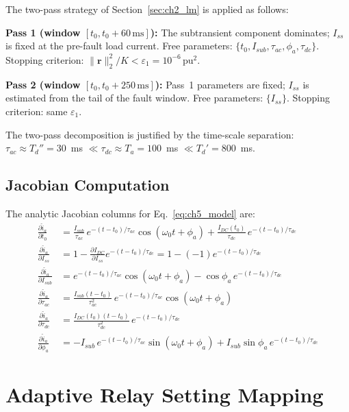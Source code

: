 The two-pass strategy of Section~\ref{sec:ch2_lm} is applied as follows:

\textbf{Pass 1 (window $[t_0, t_0 + 60\,\text{ms}]$):} The subtransient
component dominates; $I_{ss}$ is fixed at the pre-fault load current.
Free parameters: $\{t_0, I_{sub}, \tau_{ac}, \phi_a, \tau_{dc}\}$.
Stopping criterion: $\|\mathbf{r}\|_2^2 / K < \varepsilon_1 = 10^{-6}$\,pu$^2$.

\textbf{Pass 2 (window $[t_0, t_0 + 250\,\text{ms}]$):} Pass~1 parameters
are fixed; $I_{ss}$ is estimated from the tail of the fault window.
Free parameters: $\{I_{ss}\}$.
Stopping criterion: same $\varepsilon_1$.

The two-pass decomposition is justified by the time-scale separation:
$\tau_{ac} \approx T_d'' = 30$~ms $\ll \tau_{dc} \approx T_a = 100$~ms
$\ll T_d' = 800$~ms.

\subsection{Jacobian Computation}

The analytic Jacobian columns for Eq.~\eqref{eq:ch5_model} are:
\begin{align}
  \frac{\partial \hat{i}_a}{\partial t_0} &=
    \frac{I_{sub}}{\tau_{ac}}\,e^{-(t-t_0)/\tau_{ac}}\cos(\omega_0 t + \phi_a)
    + \frac{I_{DC}(t_0)}{\tau_{dc}}\,e^{-(t-t_0)/\tau_{dc}} \\
  \frac{\partial \hat{i}_a}{\partial I_{ss}} &= 1 - \frac{\partial I_{DC}}{\partial I_{ss}}
    e^{-(t-t_0)/\tau_{dc}} = 1 - (-1)e^{-(t-t_0)/\tau_{dc}} \\
  \frac{\partial \hat{i}_a}{\partial I_{sub}} &=
    e^{-(t-t_0)/\tau_{ac}}\cos(\omega_0 t + \phi_a) - \cos\phi_a\,e^{-(t-t_0)/\tau_{dc}} \\
  \frac{\partial \hat{i}_a}{\partial \tau_{ac}} &=
    \frac{I_{sub}(t-t_0)}{\tau_{ac}^2}\,e^{-(t-t_0)/\tau_{ac}}\cos(\omega_0 t + \phi_a) \\
  \frac{\partial \hat{i}_a}{\partial \tau_{dc}} &=
    \frac{I_{DC}(t_0)(t-t_0)}{\tau_{dc}^2}\,e^{-(t-t_0)/\tau_{dc}} \\
  \frac{\partial \hat{i}_a}{\partial \phi_a} &=
    -I_{sub}\,e^{-(t-t_0)/\tau_{ac}}\sin(\omega_0 t + \phi_a)
    + I_{sub}\sin\phi_a\,e^{-(t-t_0)/\tau_{dc}}
\end{align}

\section{Adaptive Relay Setting Mapping}
\label{sec:ch5_relay}

